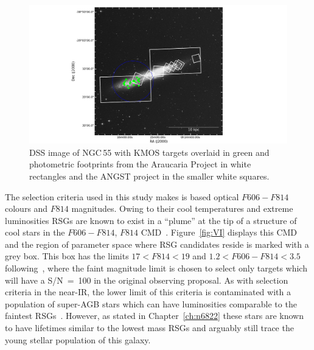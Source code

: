 \begin{figure}
 \centering
 \includegraphics[width=\textwidth]{ngc55/ngc55_fields-v3}
 \caption[DSS image of NGC\,55 with KMOS and photometric footprints highlighted]{
          DSS image of NGC\,55 with KMOS targets overlaid in green and photometric footprints from the Araucaria Project
          \protect\citep{2005Msngr.121...23G} in white rectangles
          and the ANGST project
          \protect\citep{2009ApJS..183...67D} in the smaller white squares.
         }
 \label{fig:ngc55-foot}
\end{figure}

The selection criteria used in this study makes is based optical $F606-F814$ colours and $F814$ magnitudes.
Owing to their cool temperatures and extreme luminosities RSGs are known to exist in a ``plume'' at the tip of a structure of cool stars in the $F606-F814$, $F814$ CMD~\citep[e.g.][]{2015ApJ...805..182G}.
Figure~\ref{fig:VI} displays this CMD and the region of parameter space where RSG candidates reside is marked with a grey box.
This box has the limits $17 < F814 < 19$ and $1.2 < F606-F814 < 3.5$ following~\cite{2015ApJ...805..182G}, where the faint magnitude limit is chosen to select only targets which will have a S/N~=~100 in the original observing proposal.
As with selection criteria in the near-IR, the lower limit of this criteria is contaminated with a population of super-AGB stars which can have luminosities comparable to the faintest RSGs~\citep[e.g.][]{2000ApJ...542..804N}.
However, as stated in Chapter~\ref{ch:n6822} these stars are known to have lifetimes similar to the lowest mass RSGs and arguably still trace the young stellar population of this galaxy.


